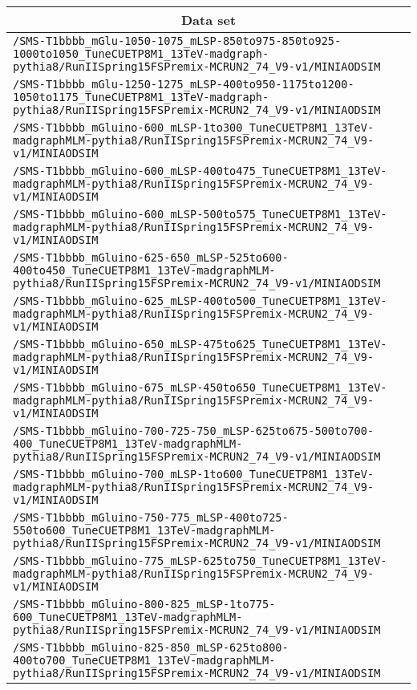 \begin{center}
\begin{tabular}{l}
\hline\hline
\multicolumn{1}{c}{Data set}\tabularnewline
\hline
\verb!/SMS-T1bbbb_mGlu-1050-1075_mLSP-850to975-850to925-1000to1050_TuneCUETP8M1_13TeV-madgraph-pythia8/RunIISpring15FSPremix-MCRUN2_74_V9-v1/MINIAODSIM! \tabularnewline
\verb!/SMS-T1bbbb_mGlu-1250-1275_mLSP-400to950-1175to1200-1050to1175_TuneCUETP8M1_13TeV-madgraph-pythia8/RunIISpring15FSPremix-MCRUN2_74_V9-v1/MINIAODSIM! \tabularnewline
\verb!/SMS-T1bbbb_mGluino-600_mLSP-1to300_TuneCUETP8M1_13TeV-madgraphMLM-pythia8/RunIISpring15FSPremix-MCRUN2_74_V9-v1/MINIAODSIM! \tabularnewline
\verb!/SMS-T1bbbb_mGluino-600_mLSP-400to475_TuneCUETP8M1_13TeV-madgraphMLM-pythia8/RunIISpring15FSPremix-MCRUN2_74_V9-v1/MINIAODSIM! \tabularnewline
\verb!/SMS-T1bbbb_mGluino-600_mLSP-500to575_TuneCUETP8M1_13TeV-madgraphMLM-pythia8/RunIISpring15FSPremix-MCRUN2_74_V9-v1/MINIAODSIM! \tabularnewline
\verb!/SMS-T1bbbb_mGluino-625-650_mLSP-525to600-400to450_TuneCUETP8M1_13TeV-madgraphMLM-pythia8/RunIISpring15FSPremix-MCRUN2_74_V9-v1/MINIAODSIM! \tabularnewline
\verb!/SMS-T1bbbb_mGluino-625_mLSP-400to500_TuneCUETP8M1_13TeV-madgraphMLM-pythia8/RunIISpring15FSPremix-MCRUN2_74_V9-v1/MINIAODSIM! \tabularnewline
\verb!/SMS-T1bbbb_mGluino-650_mLSP-475to625_TuneCUETP8M1_13TeV-madgraphMLM-pythia8/RunIISpring15FSPremix-MCRUN2_74_V9-v1/MINIAODSIM! \tabularnewline
\verb!/SMS-T1bbbb_mGluino-675_mLSP-450to650_TuneCUETP8M1_13TeV-madgraphMLM-pythia8/RunIISpring15FSPremix-MCRUN2_74_V9-v1/MINIAODSIM! \tabularnewline
\verb!/SMS-T1bbbb_mGluino-700-725-750_mLSP-625to675-500to700-400_TuneCUETP8M1_13TeV-madgraphMLM-pythia8/RunIISpring15FSPremix-MCRUN2_74_V9-v1/MINIAODSIM! \tabularnewline
\verb!/SMS-T1bbbb_mGluino-700_mLSP-1to600_TuneCUETP8M1_13TeV-madgraphMLM-pythia8/RunIISpring15FSPremix-MCRUN2_74_V9-v1/MINIAODSIM! \tabularnewline
\verb!/SMS-T1bbbb_mGluino-750-775_mLSP-400to725-550to600_TuneCUETP8M1_13TeV-madgraphMLM-pythia8/RunIISpring15FSPremix-MCRUN2_74_V9-v1/MINIAODSIM! \tabularnewline
\verb!/SMS-T1bbbb_mGluino-775_mLSP-625to750_TuneCUETP8M1_13TeV-madgraphMLM-pythia8/RunIISpring15FSPremix-MCRUN2_74_V9-v1/MINIAODSIM! \tabularnewline
\verb!/SMS-T1bbbb_mGluino-800-825_mLSP-1to775-600_TuneCUETP8M1_13TeV-madgraphMLM-pythia8/RunIISpring15FSPremix-MCRUN2_74_V9-v1/MINIAODSIM! \tabularnewline
\verb!/SMS-T1bbbb_mGluino-825-850_mLSP-625to800-400to700_TuneCUETP8M1_13TeV-madgraphMLM-pythia8/RunIISpring15FSPremix-MCRUN2_74_V9-v1/MINIAODSIM! \tabularnewline

\end{tabular}
\end{center}
